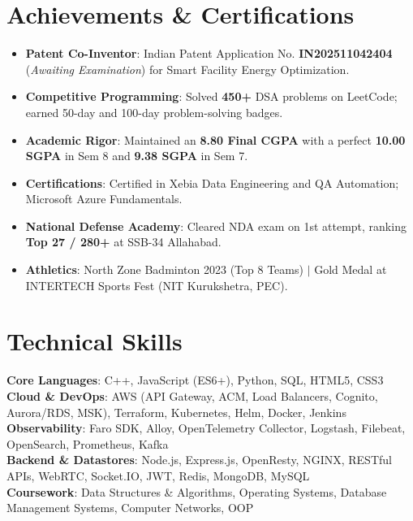 \documentclass[letterpaper,9.5pt]{article}
\newcommand{\resumeItem}[1]{
  \item\small{
    {#1 \vspace{-2.5pt}}
  }
}
\newcommand{\resumeItemListStart}{\begin{itemize}[leftmargin=*, itemsep=0.5pt, topsep=0pt, parsep=0pt]}
\newcommand{\resumeItemListEnd}{\end{itemize}\vspace{-4pt}}
\begin{document}
\section{Achievements \& Certifications}
  \resumeItemListStart
    \resumeItem{\textbf{Patent Co-Inventor}: Indian Patent Application No. \textbf{IN202511042404} (\emph{Awaiting Examination}) for Smart Facility Energy Optimization.}
    \resumeItem{\textbf{Competitive Programming}: Solved \textbf{450+} DSA problems on LeetCode; earned 50-day and 100-day problem-solving badges.}
    \resumeItem{\textbf{Academic Rigor}: Maintained an \textbf{8.80 Final CGPA} with a perfect \textbf{10.00 SGPA} in Sem 8 and \textbf{9.38 SGPA} in Sem 7.}
    \resumeItem{\textbf{Certifications}: Certified in Xebia Data Engineering and QA Automation; Microsoft Azure Fundamentals.}
    \resumeItem{\textbf{National Defense Academy}: Cleared NDA exam on 1st attempt, ranking \textbf{Top 27 / 280+} at SSB-34 Allahabad.}
    \resumeItem{\textbf{Athletics}: North Zone Badminton 2023 (Top 8 Teams) $\vert$ Gold Medal at INTERTECH Sports Fest (NIT Kurukshetra, PEC).}
  \resumeItemListEnd

\section{Technical Skills}
 \begin{itemize}[leftmargin=*, label={}, itemsep=0.5pt, topsep=0pt, parsep=0pt]
    \small{\item{
     \textbf{Core Languages}{: C++, JavaScript (ES6+), Python, SQL, HTML5, CSS3} \\ \vspace{0.5pt}
     \textbf{Cloud \& DevOps}{: AWS (API Gateway, ACM, Load Balancers, Cognito, Aurora/RDS, MSK), Terraform, Kubernetes, Helm, Docker, Jenkins} \\ \vspace{0.5pt}
     \textbf{Observability}{: Faro SDK, Alloy, OpenTelemetry Collector, Logstash, Filebeat, OpenSearch, Prometheus, Kafka} \\ \vspace{0.5pt}
     \textbf{Backend \& Datastores}{: Node.js, Express.js, OpenResty, NGINX, RESTful APIs, WebRTC, Socket.IO, JWT, Redis, MongoDB, MySQL} \\ \vspace{0.5pt}
     \textbf{Coursework}{: Data Structures \& Algorithms, Operating Systems, Database Management Systems, Computer Networks, OOP}
    }}
 \end{itemize}
 \vspace{-8pt}
\end{document}
